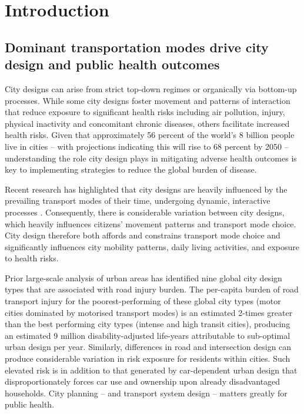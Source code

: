 \documentclass[preprint,10pt]{elsarticle} %
\begin{document}
\section*{Introduction}
\subsection*{Dominant transportation modes drive city design and public health outcomes}
City designs can arise from strict top-down regimes\cite{mundigo1977city} or organically via bottom-up processes\cite{batty2017thinking, dovey2023atlas}. While some city designs foster movement and patterns of interaction that reduce exposure to significant health risks including air pollution, injury, physical inactivity and concomitant chronic diseases, others facilitate increased health risks\cite{Wijnands2022, Stevenson2016,wang2023flood, stanley2022managing}. Given that approximately 56 percent of the world's 8 billion people live in cities -- with projections indicating this will rise to 68 percent by 2050\cite{WHO2023} -- understanding the role city design plays in mitigating adverse health outcomes is key to implementing strategies to reduce the global burden of disease. 

Recent research has highlighted that city designs are heavily influenced by the prevailing transport modes of their time\cite{KNOWLES2020102607}, undergoing dynamic, interactive processes \cite{Strano2012}. Consequently, there is considerable variation between city designs, which heavily influences citizens' movement patterns and transport mode choice\cite{Thompson2020}. City design therefore both affords and constrains transport mode choice and significantly influences city mobility patterns, daily living activities, and exposure to health risks\cite{WHO2023}.

Prior large-scale analysis of urban areas has identified nine global city design types that are associated with road injury burden\cite{Thompson2020}. The per-capita burden of road transport injury for the poorest-performing of these global city types (motor cities dominated by motorised transport modes) is an estimated 2-times greater than the best performing city types (intense and high transit cities), producing an estimated 9 million disability-adjusted life-years attributable to sub-optimal urban design per year\cite{Thompson2020}. Similarly, differences in road and intersection design can produce considerable variation in risk exposure for residents within cities\cite{Wijnands_IntersectionDesign2021,MORRISON2019123}. Such elevated risk is in addition to that generated by car-dependent urban design that disproportionately forces car use and ownership upon already disadvantaged households\cite{currie2018alarming, CURL201861}. City planning -- and transport system design -- matters greatly for public health.
\end{document}
